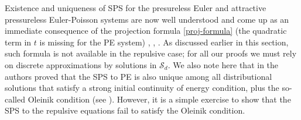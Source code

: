\documentclass[11pt]{article}
\numberwithin{equation}{section}
\begin{document}
        Existence and uniqueness of SPS for the presureless Euler and attractive pressureless Euler-Poisson systems are now well understood and come up as an immediate consequence of the projection formula \eqref{proj-formula} (the quadratic term in $t$ is missing for the PE system) \cite{Natile-Savare}, \cite{Suder-Tudorascu}, \cite{BLPTW}.
        As discussed earlier in this section, such  formula is not available in the repulsive case; for all our proofs we must rely on discrete approximations by solutions in $\mathcal{S}_d$.
        We also note here that in \cite{Suder-Tudorascu} the authors proved that the SPS to PE is also unique among all distributional solutions that satisfy a strong initial continuity of energy condition, plus the so-called Oleinik condition (see \cite{Suder-Tudorascu}). However, it is a simple exercise to show that the SPS to the repulsive equations fail to satisfy the Oleinik condition.
\end{document}
